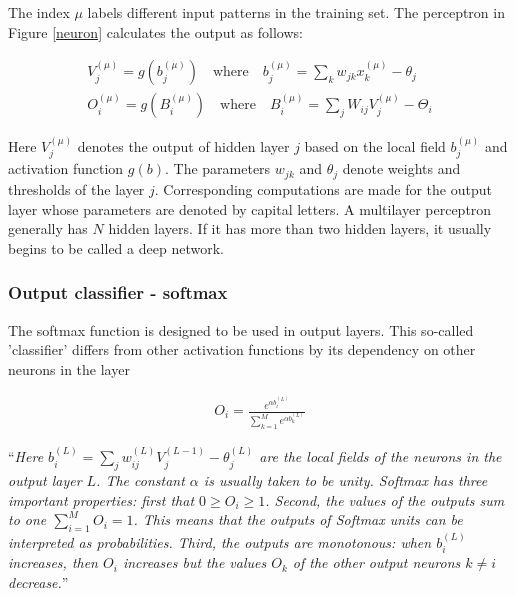 The index $ \mu $ labels different input patterns in the training set. The perceptron in Figure \ref{neuron} calculates the output as follows: \cite{mehlig}

\begin{gather}
V_j^{(\mu)} = g(b_j^{(\mu)}) \quad \text{where} \quad b_j^{(\mu)} = \sum_{k} w_{jk} x_{k}^{(\mu)} - \theta_{j} \\
O_i^{(\mu)} = g(B_i^{(\mu)}) \quad \text{where} \quad B_i^{(\mu)} = \sum_{j} W_{ij} V_{j}^{(\mu)} - \Theta_{i} 
\end{gather}

Here $ V_j^{(\mu)} $ denotes the output of hidden layer $ j $ based on the local field $ b_j^{(\mu)} $ and activation function $ g(b) $. The parameters $ w_{jk} $ and $ \theta_{j} $ denote weights and thresholds of the layer $ j $. Corresponding computations are made for the output layer whose parameters are denoted by capital letters. \cite{mehlig} A multilayer perceptron generally has $ N $ hidden layers. If it has more than two hidden layers, it usually begins to be called a deep network. 

\subsubsection{Output classifier - softmax}

The softmax function is designed to be used in output layers. This so-called 'classifier' differs from other activation functions by its dependency on other neurons in the layer \cite{mehlig}

\begin{gather}
O_{i} = \frac{e^{\alpha b_i^{(L)}}}{\sum_{k=1}^{M} e^{\alpha b_k^{(L)}}}
\end{gather}

\enquote{\textit{Here $ b_{i}^{(L)} = \sum_{j}w_{ij}^{(L)} V_{j}^{(L-1)} - \theta _{j}^{(L)} $  are the local fields of the neurons in the output layer $ L $. The constant $\alpha$ is usually taken to be unity. Softmax has three important properties: first that $ 0 \geq O_i \geq 1 $. Second, the values of the outputs sum to one $ \sum_{i=1}^{M} O_i = 1 $. This means that the outputs of Softmax units can be interpreted as probabilities. Third, the outputs are monotonous: when $ b_i^{(L)} $ increases, then $ O_i $ increases but the values $ O_k $ of the other output neurons $ k \neq i $ decrease.}} \cite{mehlig}

